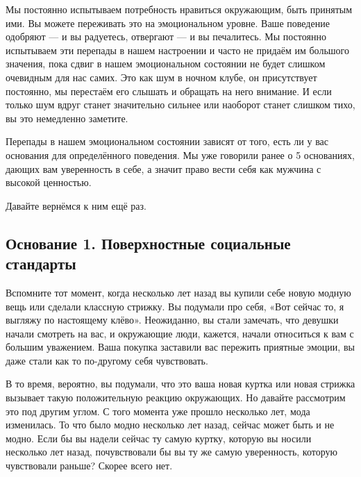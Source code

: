 Мы постоянно испытываем потребность нравиться окружающим, быть принятым ими. Вы можете переживать это на эмоциональном уровне. Ваше поведение одобряют --- и вы радуетесь, отвергают --- и вы печалитесь. Мы постоянно испытываем эти перепады в нашем настроении и часто не придаём им большого значения, пока сдвиг в нашем эмоциональном состоянии не будет слишком очевидным для нас самих. Это как шум в ночном клубе, он присутствует постоянно, мы перестаём его слышать и обращать на него внимание. И если только шум вдруг станет значительно сильнее или наоборот станет слишком тихо, вы это немедленно заметите.

Перепады в нашем эмоциональном состоянии зависят от того, есть ли у вас основания для определённого поведения. Мы уже говорили ранее о 5 основаниях, дающих вам уверенность в себе, а значит право вести себя как мужчина с высокой ценностью.

Давайте вернёмся к ним ещё раз.

\subsection{Основание 1. Поверхностные социальные стандарты}

Вспомните тот момент, когда несколько лет назад вы купили себе новую модную вещь или сделали классную стрижку. Вы подумали про себя, «Вот сейчас то, я выгляжу по настоящему клёво». Неожиданно, вы стали замечать, что девушки начали смотреть на вас, и окружающие люди, кажется, начали относиться к вам с большим уважением. Ваша покупка заставили вас пережить приятные эмоции, вы даже стали как то по-другому себя чувствовать.

В то время, вероятно, вы подумали, что это ваша новая куртка или новая стрижка вызывает такую положительную реакцию окружающих. Но давайте рассмотрим это под другим углом. С того момента уже прошло несколько лет, мода изменилась. То что было модно несколько лет назад, сейчас может быть и не модно. Если бы вы надели сейчас ту самую куртку, которую вы носили несколько лет назад, почувствовали бы вы ту же самую уверенность, которую чувствовали раньше? Скорее всего нет.

